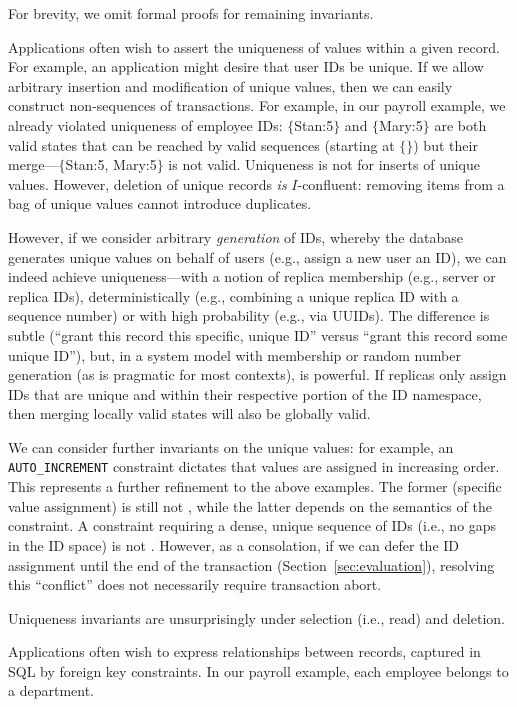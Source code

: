 For brevity, we omit formal proofs for remaining invariants.

 Applications often wish to assert the uniqueness
of values within a given record. For example, an application might
desire that user IDs be unique. If we allow arbitrary insertion and
modification of unique values, then we can easily construct
non-\iconfluent sequences of transactions. For example, in our payroll
example, we already violated uniqueness of employee IDs:
$\{$Stan:5$\}$ and $\{$Mary:5$\}$ are both valid states that can be
reached by valid sequences (starting at $\{\}$) but their
merge---$\{$Stan:5, Mary:5$\}$ is not valid. Uniqueness is not
\iconfluent for inserts of unique values. However, deletion of unique
records \textit{is} $I$-confluent: removing items from a bag of unique
values cannot introduce duplicates.

However, if we consider arbitrary \textit{generation} of IDs, whereby
the database generates unique values on behalf of users (e.g., assign
a new user an ID), we can indeed achieve uniqueness---with a notion of
replica membership (e.g., server or replica IDs), deterministically
(e.g., combining a unique replica ID with a sequence number) or with
high probability (e.g., via UUIDs). The difference is subtle (``grant
this record this specific, unique ID'' versus ``grant this record some
unique ID''), but, in a system model with membership or random number
generation (as is pragmatic for most contexts), is powerful. If
replicas only assign IDs that are unique and within their respective
portion of the ID namespace, then merging locally valid states will
also be globally valid.

We can consider further invariants on the unique values: for example,
an \texttt{AUTO\_INCREMENT} constraint dictates that values are
assigned in increasing order. This represents a further refinement to
the above examples. The former (specific value assignment) is still
not \iconfluent, while the latter depends on the semantics of the
constraint. A constraint requiring a dense, unique sequence of IDs
(i.e., no gaps in the ID space) is not \iconfluent. However, as a
consolation, if we can defer the ID assignment until the end of the
transaction (Section~\ref{sec:evaluation}), resolving this
``conflict'' does not necessarily require transaction abort. 

Uniqueness invariants are unsurprisingly \iconfluent under selection
(i.e., read) and deletion.

 Applications often wish to express
relationships between records, captured in SQL by foreign key
constraints. In our payroll example, each employee belongs to a
department.


